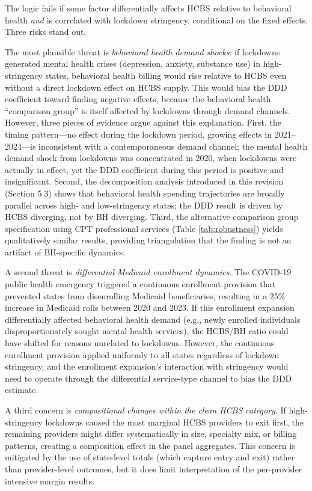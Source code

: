 \documentclass[12pt]{article}
\begin{document}
The logic fails if some factor differentially affects HCBS relative to behavioral health \textit{and} is correlated with lockdown stringency, conditional on the fixed effects. Three risks stand out.

The most plausible threat is \textit{behavioral health demand shocks}: if lockdowns generated mental health crises (depression, anxiety, substance use) in high-stringency states, behavioral health billing would rise relative to HCBS even without a direct lockdown effect on HCBS supply. This would bias the DDD coefficient toward finding negative effects, because the behavioral health ``comparison group'' is itself affected by lockdowns through demand channels. However, three pieces of evidence argue against this explanation. First, the timing pattern---no effect during the lockdown period, growing effects in 2021--2024---is inconsistent with a contemporaneous demand channel; the mental health demand shock from lockdowns was concentrated in 2020, when lockdowns were actually in effect, yet the DDD coefficient during this period is positive and insignificant. Second, the decomposition analysis introduced in this revision (Section 5.3) shows that behavioral health spending trajectories are broadly parallel across high- and low-stringency states; the DDD result is driven by HCBS diverging, not by BH diverging. Third, the alternative comparison group specification using CPT professional services (Table \ref{tab:robustness}) yields qualitatively similar results, providing triangulation that the finding is not an artifact of BH-specific dynamics.

A second threat is \textit{differential Medicaid enrollment dynamics}. The COVID-19 public health emergency triggered a continuous enrollment provision that prevented states from disenrolling Medicaid beneficiaries, resulting in a 25\% increase in Medicaid rolls between 2020 and 2023. If this enrollment expansion differentially affected behavioral health demand (e.g., newly enrolled individuals disproportionately sought mental health services), the HCBS/BH ratio could have shifted for reasons unrelated to lockdowns. However, the continuous enrollment provision applied uniformly to all states regardless of lockdown stringency, and the enrollment expansion's interaction with stringency would need to operate through the differential service-type channel to bias the DDD estimate.

A third concern is \textit{compositional changes within the clean HCBS category}. If high-stringency lockdowns caused the most marginal HCBS providers to exit first, the remaining providers might differ systematically in size, specialty mix, or billing patterns, creating a composition effect in the panel aggregates. This concern is mitigated by the use of state-level totals (which capture entry and exit) rather than provider-level outcomes, but it does limit interpretation of the per-provider intensive margin results.
\end{document}
